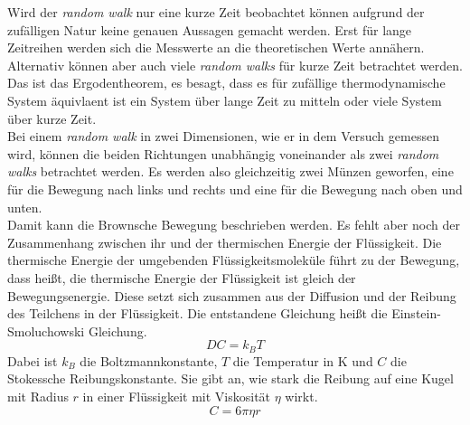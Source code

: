 Wird der \textit{random walk} nur eine kurze Zeit beobachtet können aufgrund der zufälligen Natur keine genauen Aussagen gemacht werden. Erst für lange Zeitreihen werden sich die Messwerte an die theoretischen Werte annähern. Alternativ können aber auch viele \textit{random walks} für kurze Zeit betrachtet werden. Das ist das Ergodentheorem, es besagt, dass es für zufällige thermodynamische System äquivlaent ist ein System über lange Zeit zu mitteln oder viele System über kurze Zeit.\\
Bei einem \textit{random walk} in zwei Dimensionen, wie er in dem Versuch gemessen wird, können die beiden Richtungen unabhängig voneinander als zwei \textit{random walks} betrachtet werden. Es werden also gleichzeitig zwei Münzen geworfen, eine für die Bewegung nach links und rechts und eine für die Bewegung nach oben und unten.\\

Damit kann die Brownsche Bewegung beschrieben werden. Es fehlt aber noch der Zusammenhang zwischen ihr und der thermischen Energie der Flüssigkeit. Die thermische Energie der umgebenden Flüssigkeitsmoleküle führt zu der Bewegung, dass heißt, die thermische Energie der Flüssigkeit ist gleich der Bewegungsenergie. Diese setzt sich zusammen aus der Diffusion und der Reibung des Teilchens in der Flüssigkeit. Die entstandene Gleichung heißt die  Einstein-Smoluchowski Gleichung.
\begin{equation}
  D C = k_B T
\end{equation}
Dabei ist $k_B$ die Boltzmannkonstante, $T$ die Temperatur in K und $C$ die Stokessche Reibungskonstante. Sie gibt an, wie stark die Reibung auf eine Kugel mit Radius $r$ in einer Flüssigkeit mit Viskosität $\eta$ wirkt.
\begin{equation}
  C = 6 \pi \eta r
\end{equation}
